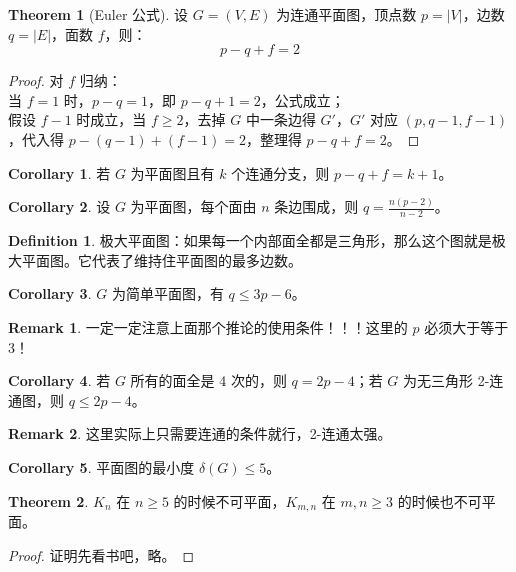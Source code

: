 \documentclass[oneside]{book}
\theoremstyle{definition}
\newtheorem{definition}{Definition}[section]
\newtheorem{theorem}{Theorem}[section]
\newtheorem{corollary}{Corollary}[section]
\newtheorem{remark}{Remark}[section]
\begin{document}
\begin{theorem}[Euler 公式]
	设 \( G=(V,E) \) 为连通平面图，顶点数 \( p=|V| \)，边数 \( q=|E| \)，面数 \( f \)，则：
	\[
	p - q + f = 2
	\]
\end{theorem}

\begin{proof}
	对 \( f \) 归纳：\\
	当 \( f=1 \) 时，\( p - q = 1 \)，即 \( p - q + 1 = 2 \)，公式成立；\\
假设 \( f-1 \) 时成立，当 \( f \geq 2 \)，去掉 \( G \) 中一条边得 \( G' \)，\( G' \) 对应 \( (p, q-1, f-1) \)，代入得 \( p - (q-1) + (f-1) = 2 \)，整理得 \( p - q + f = 2 \)。
\end{proof}

\begin{corollary}
	若 \( G \) 为平面图且有 \( k \) 个连通分支，则 \( p - q + f = k + 1 \)。
\end{corollary}

\begin{corollary}
	设 \( G \) 为平面图，每个面由 \( n \) 条边围成，则 \( q = \frac{n(p-2)}{n-2} \)。
\end{corollary}
\begin{definition}
	极大平面图：如果每一个内部面全都是三角形，那么这个图就是极大平面图。它代表了维持住平面图的最多边数。
\end{definition}
\begin{corollary}
	\( G \) 为简单平面图，有 \( q \leq 3p - 6 \)。
\end{corollary}
\begin{remark}
	一定一定注意上面那个推论的使用条件！！！这里的 \(p\) 必须大于等于 3！
\end{remark}
\begin{corollary}
	若 \( G \) 所有的面全是 4 次的，则 \( q = 2p - 4 \)；若 \( G \) 为无三角形 2-连通图，则 \( q \leq 2p - 4 \)。
\end{corollary}
\begin{remark}
	这里实际上只需要连通的条件就行，2-连通太强。
\end{remark}
\begin{corollary}
	平面图的最小度 \( \delta(G) \leq 5 \)。
\end{corollary}
\begin{theorem}
	\(K_n\) 在 \(n\geq 5\) 的时候不可平面，\(K_{m,n}\) 在 \(m,n\geq 3\) 的时候也不可平面。
\end{theorem}
\begin{proof}
	证明先看书吧，略。
\end{proof}
\end{document}
